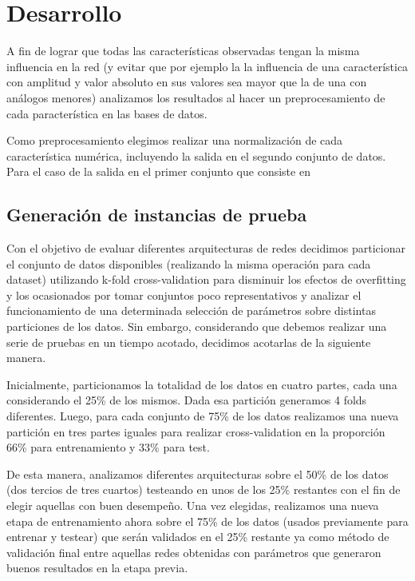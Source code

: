 \documentclass[informe.tex]{subfiles}
\begin{document}
  
  \section{Desarrollo}

  A fin de lograr que todas las características observadas tengan la misma influencia en la red (y evitar que por ejemplo la la influencia de una característica con amplitud y valor absoluto en sus valores sea mayor que la de una con análogos menores) analizamos los resultados al hacer un preprocesamiento de cada paracterística en las bases de datos.
  
  Como preprocesamiento elegimos realizar una normalización de cada característica numérica, incluyendo la salida en el segundo conjunto de datos. Para el caso de la salida en el primer conjunto que consiste en 
  
  
  
  
  
    \subsection{Generación de instancias de prueba}
    
      Con el objetivo de evaluar diferentes arquitecturas de redes decidimos particionar el conjunto de datos disponibles (realizando la misma operación para cada dataset) utilizando k-fold cross-validation para disminuir los efectos de overfitting y los ocasionados por tomar conjuntos poco representativos y analizar el funcionamiento de una determinada selección de parámetros sobre distintas particiones de los datos. Sin embargo, considerando que debemos realizar una serie de pruebas en un tiempo acotado, decidimos acotarlas de la siguiente manera.
      
      Inicialmente, particionamos la totalidad de los datos en cuatro partes, cada una considerando el 25\% de los mismos. Dada esa partición generamos 4 folds diferentes. Luego, para cada conjunto de 75\% de los datos realizamos una nueva partici\'on en tres partes iguales para realizar cross-validation en la proporci\'on 66\% para entrenamiento y 33\% para test. 
      
      De esta manera, analizamos diferentes arquitecturas sobre el 50\% de los datos (dos tercios de tres cuartos) testeando en unos de los 25\% restantes con el fin de elegir aquellas con buen desempeño. Una vez elegidas, realizamos una nueva etapa de entrenamiento ahora sobre el 75\% de los datos (usados previamente para entrenar y testear) que ser\'an validados en el 25\% restante ya como m\'etodo de validaci\'on final entre aquellas redes obtenidas con parámetros que generaron buenos resultados en la etapa previa.
      
      
  
\end{document}
